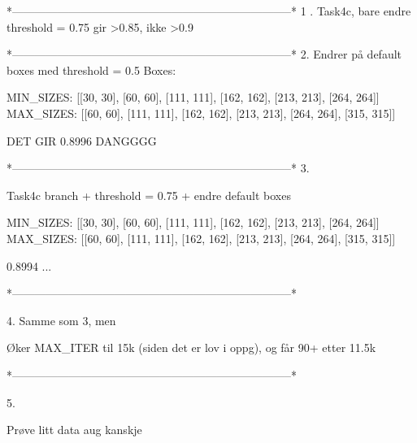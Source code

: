 *--------------------------------------------------------------------------*
1 . Task4c, bare endre threshold = 0.75 gir >0.85, ikke >0.9


*--------------------------------------------------------------------------*
2. 
Endrer på default boxes med threshold = 0.5
Boxes:

MIN_SIZES: [[30, 30], [60, 60], [111, 111], [162, 162], [213, 213], [264, 264]]
MAX_SIZES: [[60, 60], [111, 111], [162, 162], [213, 213], [264, 264], [315, 315]]

DET GIR 0.8996 DANGGGG

*--------------------------------------------------------------------------*
3.

Task4c branch + threshold = 0.75 + endre default boxes

MIN_SIZES: [[30, 30], [60, 60], [111, 111], [162, 162], [213, 213], [264, 264]]
MAX_SIZES: [[60, 60], [111, 111], [162, 162], [213, 213], [264, 264], [315, 315]]

0.8994 ...

*--------------------------------------------------------------------------*

4.
Samme som 3, men

Øker MAX_ITER til 15k (siden det er lov i oppg), og får 90+ etter 11.5k

*--------------------------------------------------------------------------*

5.

Prøve litt data aug kanskje